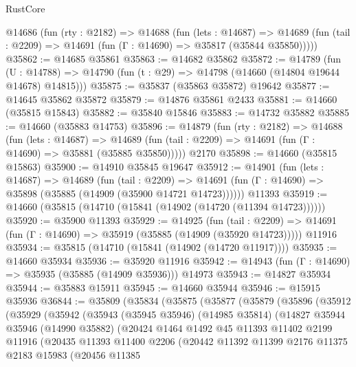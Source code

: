 \begin{lexlean}{RustCore}
\begin{coremodule}
  @14686
    (fun (rty : @2182) =>
    @14688
      (fun (lets : @14687) =>
      @14689 (fun (tail : @2209) => @14691 (fun (Γ : @14690) => @35817 (@35844 @35850)))))
@35862 := @14685 @35861
@35863 := @14682 @35862
@35872 := @14789
    (fun (U : @14788) => @14790 (fun (t : @29) => @14798 (@14660 (@14804 @19644 @14678) @14815)))
@35875 := @35837 (@35863 @35872) @19642
@35877 := @14645 @35862 @35872
@35879 := @14876 @35861 @2433
@35881 := @14660 (@35815 @15843)
@35882 := @35840 @15846
@35883 := @14732 @35882
@35885 := @14660 (@35883 @14753)
@35896 := @14879
    (fun (rty : @2182) =>
    @14688
      (fun (lets : @14687) =>
      @14689 (fun (tail : @2209) => @14691 (fun (Γ : @14690) => @35881 (@35885 @35850)))))
    @2170
@35898 := @14660 (@35815 @15863)
@35900 := @14910 @35845 @19647
@35912 := @14901
    (fun (lets : @14687) =>
    @14689
      (fun (tail : @2209) =>
      @14691 (fun (Γ : @14690) => @35898 (@35885 (@14909 (@35900 @14721 @14723))))))
    @11393
@35919 := @14660 (@35815 (@14710 (@15841 (@14902 (@14720 (@11394 @14723))))))
@35920 := @35900 @11393
@35929 := @14925
    (fun (tail : @2209) => @14691 (fun (Γ : @14690) => @35919 (@35885 (@14909 (@35920 @14723)))))
    @11916
@35934 := @35815 (@14710 (@15841 (@14902 (@14720 @11917))))
@35935 := @14660 @35934
@35936 := @35920 @11916
@35942 := @14943 (fun (Γ : @14690) => @35935 (@35885 (@14909 @35936))) @14973
@35943 := @14827 @35934
@35944 := @35883 @15911
@35945 := @14660 @35944
@35946 := @15915 @35936
@36844 := @35809
    (@35834
      (@35875
        (@35877
          (@35879
            (@35896
              (@35912
                (@35929
                  (@35942
                    (@35943
                      (@35945 @35946)
                      (@14985 @35814)
                      (@14827
                        @35944
                        @35946
                        (@14990 @35882)
                        (@20424
                          @1464
                          @1492
                          @45
                          @11393
                          @11402
                          @2199
                          @11916
                          (@20435
                            @11393
                            @11400
                            @2206
                            (@20442
                              @11392
                              @11399
                              @2176
                              @11375
                              @2183
                              @15983
                              (@20456
                                @11385

\end{coremodule}
\end{lexlean}
